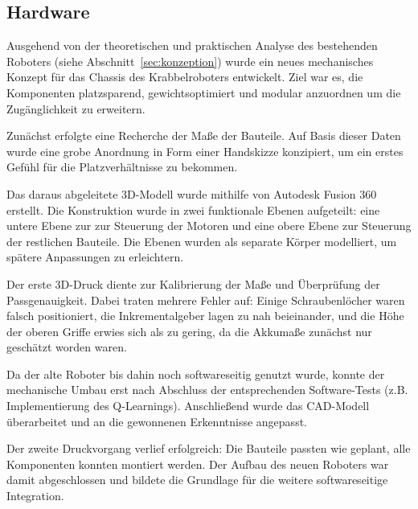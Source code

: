 \subsection{Hardware}

Ausgehend von der theoretischen und praktischen Analyse des bestehenden Roboters (siehe Abschnitt~\ref{sec:konzeption}) wurde ein neues mechanisches Konzept für das Chassis des Krabbelroboters 
entwickelt. Ziel war es, die Komponenten platzsparend, gewichtsoptimiert und modular anzuordnen um die Zugänglichkeit zu erweitern.

Zunächst erfolgte eine Recherche der Maße der Bauteile. Auf Basis dieser Daten wurde eine grobe Anordnung in Form einer Handskizze konzipiert, um ein erstes Gefühl für die Platzverhältnisse zu bekommen.

Das daraus abgeleitete 3D-Modell wurde mithilfe von Autodesk Fusion 360 erstellt. Die Konstruktion wurde in zwei funktionale Ebenen aufgeteilt: 
eine untere Ebene zur zur Steuerung der Motoren und eine obere Ebene zur Steuerung der restlichen Bauteile. 
Die Ebenen wurden als separate Körper modelliert, um spätere Anpassungen zu erleichtern.

Der erste 3D-Druck diente zur Kalibrierung der Maße und Überprüfung der Passgenauigkeit. Dabei traten mehrere Fehler auf: 
Einige Schraubenlöcher waren falsch positioniert, die Inkrementalgeber lagen zu nah beieinander, und die Höhe der oberen Griffe erwies sich als zu gering, 
da die Akkumaße zunächst nur geschätzt worden waren.

Da der alte Roboter bis dahin noch softwareseitig genutzt wurde, konnte der mechanische Umbau erst nach Abschluss der entsprechenden Software-Tests (z.B. Implementierung des Q-Learnings). 
Anschließend wurde das CAD-Modell überarbeitet und an die gewonnenen Erkenntnisse angepasst.

Der zweite Druckvorgang verlief erfolgreich: Die Bauteile passten wie geplant, alle Komponenten konnten montiert werden. 
Der Aufbau des neuen Roboters war damit abgeschlossen und bildete die Grundlage für die weitere softwareseitige Integration.
